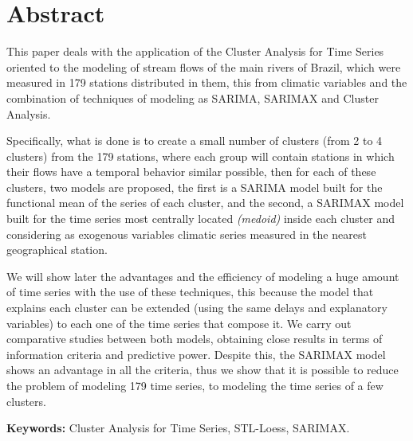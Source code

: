 \documentclass[12pt,oneside]{book}\usepackage[]{graphicx}\usepackage[]{color}
\theoremstyle{definition} %
\begin{document}
\chapter*{Abstract}
{}

This paper deals with the application of the Cluster Analysis for Time Series oriented to the modeling of stream flows of the main rivers of Brazil, which were measured in 179 stations distributed in them, this from climatic variables and the combination of techniques of modeling as SARIMA, SARIMAX and Cluster Analysis.

Specifically, what is done is to create a small number of clusters (from 2 to 4 clusters) from the 179 stations, where each group will contain stations in which their flows have a temporal behavior similar possible, then for each of these clusters, two models are proposed, the first is a SARIMA model built for the functional mean of the series of each cluster, and the second, a SARIMAX model built for the time series most centrally located \textit{(medoid)} inside each cluster and considering as exogenous variables climatic series measured in the nearest geographical station.

We will show later the advantages and the efficiency of modeling a huge amount of time series with the use of these techniques, this because the model that explains each cluster can be extended (using the same delays and explanatory variables) to each one of the time series that compose it.
We carry out comparative studies between both models, obtaining close results in terms of information criteria and predictive power. Despite this, the SARIMAX model shows an advantage in all the criteria, 
thus we show that it is possible to reduce the problem of modeling 179 time series, to modeling the time series of a few clusters.

\vspace{5mm}

\textbf{Keywords:}  Cluster Analysis for Time Series, STL-Loess, SARIMAX.
\end{document}
